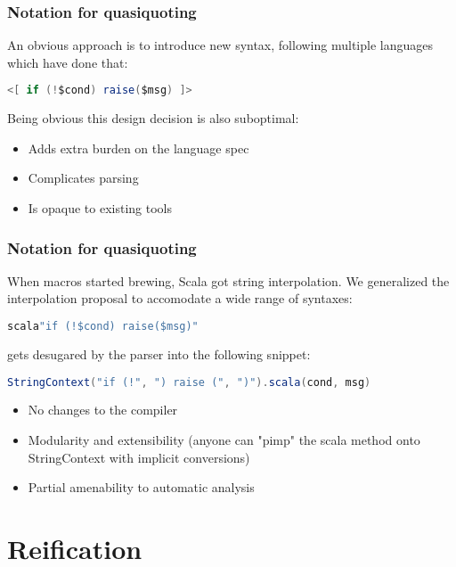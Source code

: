 \documentclass[hyperref={bookmarks=false}]{beamer}
\begin{document}
\begin{frame}[fragile]
\frametitle{Notation for quasiquoting}

An obvious approach is to introduce new syntax, following multiple languages which have done that:

\begin{lstlisting}[language=scala]
<[ if (!$cond) raise($msg) ]>
\end{lstlisting}

Being obvious this design decision is also suboptimal:
\begin{itemize}
\item Adds extra burden on the language spec
\item Complicates parsing
\item Is opaque to existing tools
\end{itemize}
\end{frame}

\begin{frame}[fragile]
\frametitle{Notation for quasiquoting}

When macros started brewing, Scala got string interpolation. We generalized the interpolation proposal to accomodate a wide range of syntaxes:

\begin{lstlisting}[language=scala]
scala"if (!$cond) raise($msg)"
\end{lstlisting}

gets desugared by the parser into the following snippet:

\begin{lstlisting}[language=scala]
StringContext("if (!", ") raise (", ")").scala(cond, msg)
\end{lstlisting}

\begin{itemize}
\item No changes to the compiler
\item Modularity and extensibility (anyone can "pimp" the scala method onto StringContext with implicit conversions)
\item Partial amenability to automatic analysis
\end{itemize}
\end{frame}

\section{Reification}
\end{document}

